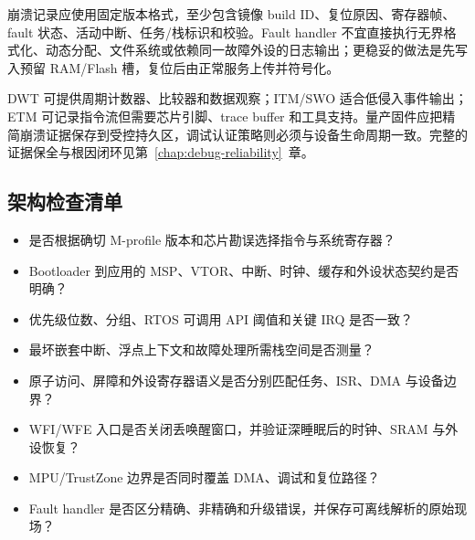 崩溃记录应使用固定版本格式，至少包含镜像 build ID、复位原因、寄存器帧、fault 状态、活动中断、任务/栈标识和校验。Fault handler 不宜直接执行无界格式化、动态分配、文件系统或依赖同一故障外设的日志输出；更稳妥的做法是先写入预留 RAM/Flash 槽，复位后由正常服务上传并符号化。

DWT 可提供周期计数器、比较器和数据观察；ITM/SWO 适合低侵入事件输出；ETM 可记录指令流但需要芯片引脚、trace buffer 和工具支持。量产固件应把精简崩溃证据保存到受控持久区，调试认证策略则必须与设备生命周期一致。完整的证据保全与根因闭环见第~\ref{chap:debug-reliability}~章。

\subsection{架构检查清单}

\begin{itemize}
  \item 是否根据确切 M-profile 版本和芯片勘误选择指令与系统寄存器？
  \item Bootloader 到应用的 MSP、VTOR、中断、时钟、缓存和外设状态契约是否明确？
  \item 优先级位数、分组、RTOS 可调用 API 阈值和关键 IRQ 是否一致？
  \item 最坏嵌套中断、浮点上下文和故障处理所需栈空间是否测量？
  \item 原子访问、屏障和外设寄存器语义是否分别匹配任务、ISR、DMA 与设备边界？
  \item WFI/WFE 入口是否关闭丢唤醒窗口，并验证深睡眠后的时钟、SRAM 与外设恢复？
  \item MPU/TrustZone 边界是否同时覆盖 DMA、调试和复位路径？
  \item Fault handler 是否区分精确、非精确和升级错误，并保存可离线解析的原始现场？
\end{itemize}
